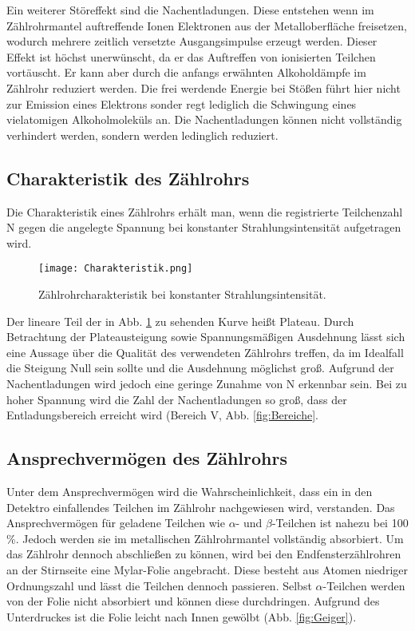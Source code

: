 Ein weiterer Störeffekt sind die Nachentladungen. Diese entstehen wenn im Zählrohrmantel
auftreffende Ionen Elektronen aus der Metalloberfläche freisetzen, wodurch mehrere
zeitlich versetzte Ausgangsimpulse erzeugt werden. Dieser Effekt ist höchst unerwünscht,
da er das Auftreffen von ionisierten Teilchen vortäuscht. Er kann aber durch die anfangs
erwähnten Alkoholdämpfe im Zählrohr reduziert werden. Die frei werdende Energie
bei Stößen führt hier nicht zur Emission eines Elektrons sonder regt lediglich
die Schwingung eines vielatomigen Alkoholmoleküls an. Die Nachentladungen
können nicht vollständig verhindert werden, sondern werden ledinglich reduziert.

\subsection{Charakteristik des Zählrohrs}

Die Charakteristik eines Zählrohrs erhält man, wenn die registrierte Teilchenzahl
N gegen die angelegte Spannung bei konstanter Strahlungsintensität aufgetragen wird.

\begin{figure}
  \centering
  \texttt{[image: Charakteristik.png]}
  \caption{Zählrohrcharakteristik bei konstanter Strahlungsintensität. \cite{anleitung01}}
  \label{fig:Charakteristik}
\end{figure}

Der lineare Teil der in Abb. \ref{fig:Charakteristik} zu sehenden Kurve heißt
Plateau. Durch Betrachtung der Plateausteigung sowie Spannungsmäßigen Ausdehnung
lässt sich eine Aussage über die Qualität des verwendeten Zählrohrs treffen, da
im Idealfall die Steigung Null sein sollte und die Ausdehnung möglichst groß.
Aufgrund der Nachentladungen wird jedoch eine geringe Zunahme von N erkennbar sein.
Bei zu hoher Spannung wird die Zahl der Nachentladungen so groß, dass der Entladungsbereich
erreicht wird (Bereich V, Abb. \ref{fig:Bereiche}.

\subsection{Ansprechvermögen des Zählrohrs}

Unter dem Ansprechvermögen wird die Wahrscheinlichkeit, dass ein in den
Detektro einfallendes Teilchen im Zählrohr nachgewiesen wird, verstanden.
Das Ansprechvermögen für geladene Teilchen wie $\alpha$- und $\beta$-Teilchen ist
nahezu bei 100 \%. Jedoch werden sie im metallischen Zählrohrmantel vollständig
absorbiert. Um das Zählrohr dennoch abschließen zu können,
wird bei den Endfensterzählrohren an der Stirnseite eine Mylar-Folie angebracht.
Diese besteht aus Atomen niedriger Ordnungszahl und lässt die Teilchen dennoch passieren.
Selbst $\alpha$-Teilchen werden von der Folie nicht absorbiert und können
diese durchdringen.
Aufgrund des Unterdruckes ist die Folie leicht nach Innen gewölbt (Abb. \ref{fig:Geiger}).

